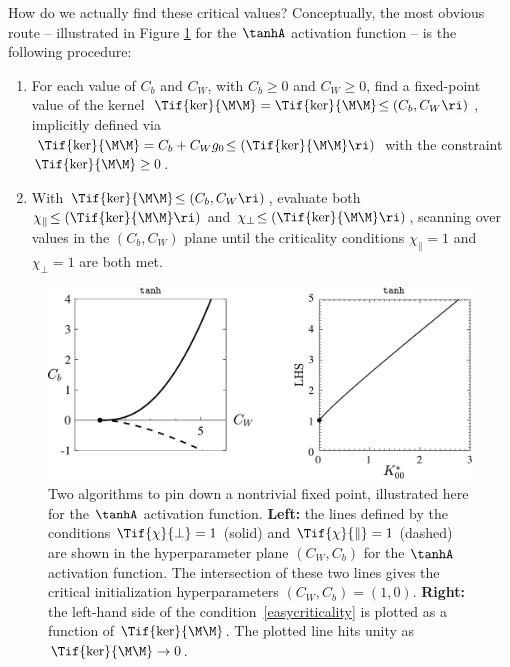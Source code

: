 












How do we actually find these critical values? %
Conceptually, the most obvious route -- illustrated in Figure \ref{fig:tanh_critical} for the $\tanhA$ activation function -- is the following procedure:
\begin{enumerate}
\item For each value of $C_b$ and $C_W$, with $C_b\geq 0$ and $C_W\geq 0$, find a fixed-point value of the kernel $\Tif{\ker}{\M\M}=\Tif{\ker}{\M\M}\!\le(C_b,C_W\ri)$, implicitly defined via $\Tif{\ker}{\M\M}=C_b+C_W g_0\!\le(\Tif{\ker}{\M\M}\ri)$ with the constraint $\Tif{\ker}{\M\M}\geq 0$.
\item %
With $\Tif{\ker}{\M\M}\!\le(C_b,C_W\ri)$, evaluate both $\chi_{\parallel}\!\le(\Tif{\ker}{\M\M}\ri)$ and $\chi_{\perp}\!\le(\Tif{\ker}{\M\M}\ri)$, scanning over values in the $(C_b, C_W)$ plane until the criticality conditions $\chi_{\parallel}=1$ and  $\chi_{\perp}=1$ are both met.%
\end{enumerate}



\begin{figure}[h]
\begin{center}
 \includegraphics[width=0.85\linewidth]{./book_figures/algorithm_and_criticality_condition_tanh}
\end{center}
\caption{Two algorithms to pin down a nontrivial fixed point, illustrated here for the $\tanhA$ activation function. \textbf{Left:} the lines defined by the conditions $\Tif{\chi}{\perp}=1$ (solid) and $\Tif{\chi}{\parallel}=1$ (dashed) are shown in the hyperparameter plane $(C_W,C_b)$ for the $\tanhA$ activation function.
The intersection of these two lines gives the critical initialization hyperparameters $(C_W,C_b)=(1,0)$.
\textbf{Right:} the left-hand side of the condition~\eqref{easycriticality} is plotted as a function of $\Tif{\ker}{\M\M}$. The plotted line hits unity as $\Tif{\ker}{\M\M}\rightarrow 0$.
}
\label{fig:tanh_critical}
\end{figure}



